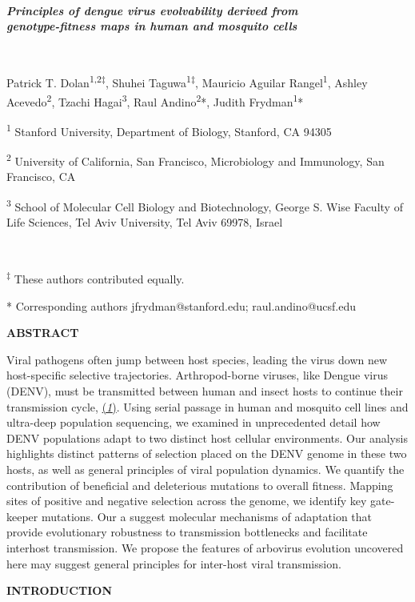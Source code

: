\documentclass[
]{article}
\author{}
\date{}
\begin{document}
\emph{\textbf{~}}

\emph{\textbf{Principles of dengue virus evolvability derived from\\
genotype-fitness maps in human and mosquito cells}}

\emph{\textbf{~}}

Patrick T. Dolan\textsuperscript{1,2‡}, Shuhei
Taguwa\textsuperscript{1‡}, Mauricio Aguilar Rangel\textsuperscript{1},
Ashley Acevedo\textsuperscript{2}, Tzachi Hagai\textsuperscript{3}, Raul
Andino\textsuperscript{2}*, Judith Frydman\textsuperscript{1}*

\textsuperscript{1} Stanford University, Department of Biology,
Stanford, CA 94305

\textsuperscript{2} University of California, San Francisco,
Microbiology and Immunology, San Francisco, CA

\textsuperscript{3} School of Molecular Cell Biology and Biotechnology,
George S. Wise Faculty of Life Sciences, Tel Aviv University, Tel Aviv
69978, Israel

~

\textsuperscript{‡} These authors contributed equally.

* Corresponding authors jfrydman@stanford.edu; raul.andino@ucsf.edu

\textbf{ABSTRACT}

Viral pathogens often jump between host species, leading the virus down
new host-specific selective trajectories. Arthropod-borne viruses, like
Dengue virus (DENV), must be transmitted between human and insect hosts
to continue their transmission cycle,
\href{https://paperpile.com/c/DR88ah/ONpBI}{(\emph{1})}. Using serial
passage in human and mosquito cell lines and ultra-deep population
sequencing, we examined in unprecedented detail how DENV populations
adapt to two distinct host cellular environments. Our analysis
highlights distinct patterns of selection placed on the DENV genome in
these two hosts, as well as general principles of viral population
dynamics. We quantify the contribution of beneficial and deleterious
mutations to overall fitness. Mapping sites of positive and negative
selection across the genome, we identify key gate-keeper mutations. Our
a suggest molecular mechanisms of adaptation that provide evolutionary
robustness to transmission bottlenecks and facilitate interhost
transmission. We propose the features of arbovirus evolution uncovered
here may suggest general principles for inter-host viral transmission.

\textbf{INTRODUCTION}
\end{document}
